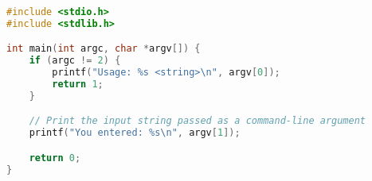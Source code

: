 
\begin{lstlisting}[language=c,caption={Exemplarisches C Programm, welches das Mitgeben eines Startparameters benötigt},label={lst:stdin_program.c}]
#include <stdio.h>
#include <stdlib.h>

int main(int argc, char *argv[]) {
    if (argc != 2) {
        printf("Usage: %s <string>\n", argv[0]);
        return 1;
    }

    // Print the input string passed as a command-line argument
    printf("You entered: %s\n", argv[1]);

    return 0;
}

\end{lstlisting}